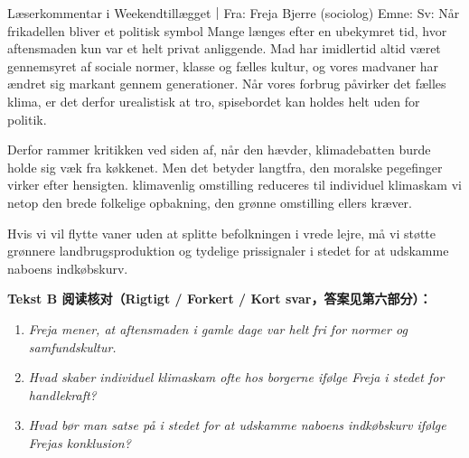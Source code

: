 \begin{emailbox}{Læserkommentar i Weekendtillægget｜Fra: Freja Bjerre (sociolog) \quad Emne: Sv: Når frikadellen bliver et politisk symbol}
Mange længes efter en ubekymret tid, hvor aftensmaden kun var et helt privat anliggende. Mad har  imidlertid altid været gennemsyret af sociale normer, klasse og fælles kultur, og vores madvaner har ændret sig markant gennem generationer. Når vores forbrug påvirker det fælles klima, er det derfor urealistisk at tro,  spisebordet kan holdes helt uden for politik.

Derfor rammer kritikken ved siden af, når den hævder,  klimadebatten burde holde sig væk fra køkkenet. Men det betyder langtfra,  den moralske pegefinger virker efter hensigten.  klimavenlig omstilling reduceres til individuel klimaskam   vi netop den brede folkelige opbakning,  den grønne omstilling ellers kræver.

Hvis vi vil flytte vaner uden at splitte befolkningen i vrede lejre, må vi støtte grønnere landbrugsproduktion og tydelige prissignaler i stedet for at udskamme naboens indkøbskurv.
\end{emailbox}

\textbf{Tekst B 阅读核对（Rigtigt / Forkert / Kort svar，答案见第六部分）：}
\begin{enumerate}
  \item \textit{Freja mener, at aftensmaden i gamle dage var helt fri for normer og samfundskultur.} \underline{\hspace{2.2cm}}
  \item \textit{Hvad skaber individuel klimaskam ofte hos borgerne ifølge Freja i stedet for handlekraft?} \underline{\hspace{2.2cm}}
  \item \textit{Hvad bør man satse på i stedet for at udskamme naboens indkøbskurv ifølge Frejas konklusion?} \\\underline{\hspace{2.2cm}}
\end{enumerate}

